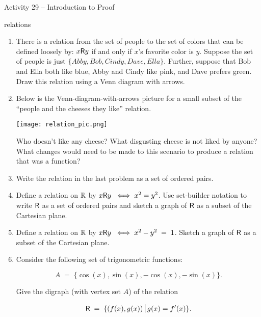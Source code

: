 \documentclass{amsart}
\begin{document}
\thispagestyle{empty}

\centerline{\Large Activity 29 -- Introduction to Proof}
\centerline{\large relations}

\bigskip
\Large


\begin{enumerate}
\item There is a relation from the set of people to the set of colors that can be defined loosely by: $x\mbox{\textsf R} y$ if and only if $x$'s favorite color is $y$.  Suppose the set of people is just $\{ Abby, Bob, Cindy, Dave, Ella\} $.  Further, suppose that Bob and Ella both like blue, Abby and Cindy like pink, and Dave prefers green.
Draw this relation using a Venn diagram with arrows.

\vfill

\newpage

\item Below is the Venn-diagram-with-arrows picture for a small subset of the ``people and the cheeses they like'' relation.  
\bigskip

\centerline{\texttt{[image: relation\_pic.png]}}
\medskip

Who doesn't like any cheese?  What disgusting cheese is not liked by anyone? What changes would need to be made to this scenario to produce a relation that was a function?

\vfill

\item Write the relation in the last problem as a set of ordered pairs.

\vfill

\newpage

\item Define a relation on ${\mathbb R}$ by $x \mbox{\textsf R} y \; \iff x^2 = y^2$.   Use set-builder notation to write $\mbox{\textsf R}$ as a set of ordered pairs and sketch a graph of $\mbox{\textsf R}$ as a subset of the Cartesian plane.

\vfill


\item Define a relation on ${\mathbb R}$ by $x \mbox{\textsf R} y \; \iff x^2 - y^2 \; = \; 1$.  Sketch a graph of $\mbox{\textsf R}$ as a subset of the Cartesian plane.

\vfill

\newpage

\item Consider the following set of trigonometric functions:

\[ A \; = \; \{ \cos{(x)}, \sin{(x)}, -\cos{(x)}, -\sin{(x)} \}. \]

Give the digraph (with vertex set $A$) of the relation 

\[ \relR \; = \; \{ (f(x),g(x) ) \suchthat g(x) = f'(x) \}. \]

\vfill

\end{enumerate}
\end{document}
